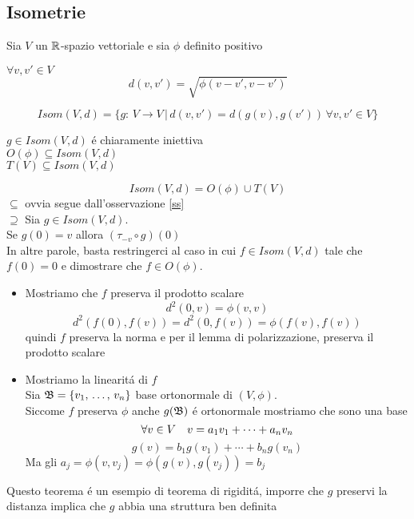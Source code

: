 \subsection{Isometrie}
Sia $V$ un $\mathbb{R}$-spazio vettoriale e sia $\phi$ definito positivo
\begin{defn}[Distanza]
$\forall v,v'\in V $
$$ d(v,v')=\sqrt{\phi(v-v',v-v')}$$
\end{defn}
\begin{defn}
$$ Isom(V,d) =\{ g:\, V \to V \, \vert\,  d(v,v')=d(g(v),g(v')) \,  \forall v,v' \in V \}$$
\end{defn}
\begin{oss}\label{ss} $g\in Isom(V,d) $ \'e chiaramente iniettiva\\
$O(\phi)\subseteq Isom(V,d)$\\
$T(V)\subseteq Isom(V,d)$
\end{oss}
\begin{thm}
$$ Isom(V,d)=O(\phi) \cup T(V)$$
\proof
$\subseteq $ ovvia segue dall'osservazione \ref{ss}\\
$\supseteq$ Sia $g\in Isom(V,d)$.\\
Se $g(0)=v $ allora $( \tau_{-v}\circ g)(0)$\\
In altre parole, basta restringerci al caso in cui $f \in Isom(V,d) $ tale che $f(0)=0 $ e dimostrare che $f\in O(\phi)$.\\
\begin{itemize}
\item Mostriamo che $f$ preserva il prodotto scalare
$$d^2(0,v)=\phi(v,v)$$
$$d^2(f(0),f(v))=d^2(0, f(v))=\phi(f(v),f(v))$$
quindi $f$ preserva la norma e per il lemma di polarizzazione, preserva il prodotto scalare

\item Mostriamo la linearit\'a di $f$\\
Sia $\mathfrak{B}=\{ v_1, \, \dots , \, v_n \} $ base ortonormale di $(V,\phi)$.\\
Siccome $f$ preserva $\phi$ anche $g(\mathfrak{B})$ \'e ortonormale mostriamo che sono una base 
$$ \forall v \in V \quad v = a_1 v_1 + \dots + a_n v_n $$
$$ g(v) =b_1 g(v_1) + \cdots + b_n g(v_n) $$
Ma gli $a_j=\phi(v,v_j)= \phi(g(v), g(v_j))=b_j$
\end{itemize}
\endproof
\end{thm}
\begin{oss}Questo teorema \'e un esempio di teorema di rigidit\'a, imporre che $g$ preservi la distanza implica che $g$ abbia una  struttura ben definita
\end{oss}
\newpage
